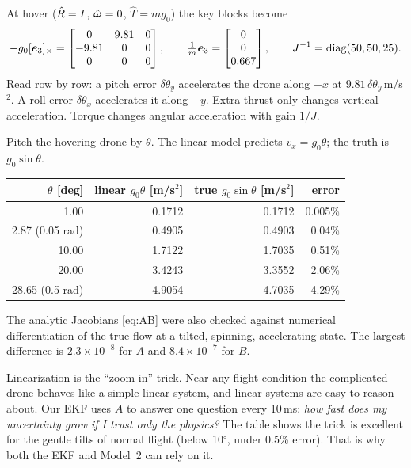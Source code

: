 At hover ($\hat{R}=I$, $\hat{\bm\omega}=0$, $\hat T=mg_0$) the key blocks become
\[
-g_0[\bm{e}_3]_{\times}=\begin{bmatrix}0&9.81&0\\-9.81&0&0\\0&0&0\end{bmatrix},\qquad
\tfrac1m\bm{e}_3=\begin{bmatrix}0\\0\\0.667\end{bmatrix},\qquad
J^{-1}=\operatorname{diag}(50,50,25).
\]
Read row by row: a pitch error $\delta\theta_y$ accelerates the drone along $+x$ at $9.81\,\delta\theta_y$\,m/s$^2$.
A roll error $\delta\theta_x$ accelerates it along $-y$. Extra thrust only changes vertical acceleration. Torque changes
angular acceleration with gain $1/J$.

\begin{toybox}
Pitch the hovering drone by $\theta$. The linear model predicts $\dot v_x=g_0\theta$; the truth is $g_0\sin\theta$.
\begin{center}\small
\begin{tabular}{rrrr}
\toprule
$\theta$ [deg] & linear $g_0\theta$ [m/s$^2$] & true $g_0\sin\theta$ [m/s$^2$] & error\\
\midrule
1.00 & 0.1712 & 0.1712 & 0.005\%\\
2.87 (0.05 rad) & 0.4905 & 0.4903 & 0.04\%\\
10.00 & 1.7122 & 1.7035 & 0.51\%\\
20.00 & 3.4243 & 3.3552 & 2.06\%\\
28.65 (0.5 rad) & 4.9054 & 4.7035 & 4.29\%\\
\bottomrule
\end{tabular}
\end{center}
The analytic Jacobians \eqref{eq:AB} were also checked against numerical differentiation of the true flow at a
tilted, spinning, accelerating state. The largest difference is $2.3\times10^{-8}$ for $A$ and $8.4\times10^{-7}$ for $B$.
\end{toybox}

\begin{projbox}
Linearization is the ``zoom-in'' trick. Near any flight condition the complicated drone behaves like a simple
linear system, and linear systems are easy to reason about. Our EKF uses $A$ to answer one question every 10\,ms:
\emph{how fast does my uncertainty grow if I trust only the physics?} The table shows the trick is excellent for
the gentle tilts of normal flight (below 10$^\circ$, under 0.5\% error). That is why both the EKF and Model~2
can rely on it.
\end{projbox}

